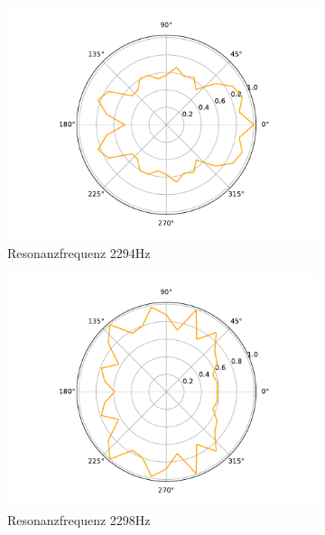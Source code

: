 \begin{figure}
    \centering
    \begin{subfigure}[b]{0.3\textwidth}
        \centering
        \includegraphics[width=\textwidth]{pic/polar_max_294.pdf}
        \caption{Resonanzfrequenz 2294Hz}
        \label{fig:polar3a}
    \end{subfigure}
    \hfill
    \begin{subfigure}[b]{0.3\textwidth}
        \centering
        \includegraphics[width=\textwidth]{pic/polar_max_298.pdf}
        \caption{Resonanzfrequenz 2298Hz}
        \label{fig:polar3b}
    \end{subfigure}
    \hfill
    \begin{subfigure}[b]{0.3\textwidth}

\end{subfigure}
\end{figure}
